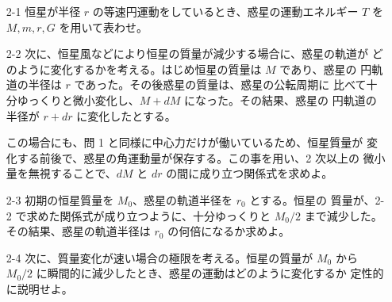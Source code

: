 \documentclass[report]{dennou777}
\begin{document}
\begin{itemize}
	\item[2-1] 恒星が半径 $r$ の等速円運動をしているとき、惑星の運動エネルギー
		$T$ を $M,m,r,G$ を用いて表わせ。
	\item[2-2] 次に、恒星風などにより恒星の質量が減少する場合に、惑星の軌道が
		どのように変化するかを考える。はじめ恒星の質量は $M$ であり、惑星の
		円軌道の半径は $r$ であった。その後惑星の質量は、惑星の公転周期に
		比べて十分ゆっくりと微小変化し、$M+dM$ になった。その結果、惑星の
		円軌道の半径が $r+dr$ に変化したとする。

		この場合にも、問 1 と同様に中心力だけが働いているため、恒星質量が
		変化する前後で、惑星の角運動量が保存する。この事を用い、2 次以上の
		微小量を無視することで、$dM$ と $dr$ の間に成り立つ関係式を求めよ。
	\item[2-3] 初期の恒星質量を $M_0$、惑星の軌道半径を $r_0$ とする。恒星の
		質量が、2-2 で求めた関係式が成り立つように、十分ゆっくりと $M_0/2$
		まで減少した。その結果、惑星の軌道半径は $r_0$ の何倍になるか求めよ。
	\item[2-4] 次に、質量変化が速い場合の極限を考える。恒星の質量が $M_0$ から
		$M_0/2$ に瞬間的に減少したとき、惑星の運動はどのように変化するか
		定性的に説明せよ。
\end{itemize}
\end{document}
